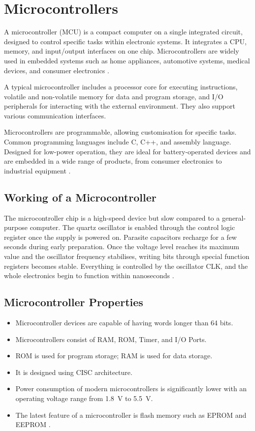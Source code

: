 \documentclass[11pt, a4paper]{report}
\begin{document}
\section{Microcontrollers}

A microcontroller (MCU) is a compact computer on a single integrated circuit,
designed to control specific tasks within electronic systems. It integrates a
CPU, memory, and input/output interfaces on one chip. Microcontrollers are
widely used in embedded systems such as home appliances, automotive systems,
medical devices, and consumer electronics \cite{geeksforgeeks}.

A typical microcontroller includes a processor core for executing
instructions, volatile and non-volatile memory for data and program storage,
and I/O peripherals for interacting with the external environment. They also
support various communication interfaces.

Microcontrollers are programmable, allowing customisation for specific tasks.
Common programming languages include C, C++, and assembly language. Designed
for low-power operation, they are ideal for battery-operated devices and are
embedded in a wide range of products, from consumer electronics to industrial
equipment \cite{geeksforgeeks}.

\subsection{Working of a Microcontroller}

The microcontroller chip is a high-speed device but slow compared to a general-purpose
computer. The quartz oscillator is enabled through the control logic register
once the supply is powered on. Parasite capacitors recharge for a few seconds
during early preparation. Once the voltage level reaches its maximum value and
the oscillator frequency stabilises, writing bits through special function
registers becomes stable. Everything is controlled by the oscillator CLK, and
the whole electronics begin to function within nanoseconds \cite{geeksforgeeks}.

\subsection{Microcontroller Properties}

\begin{itemize}
    \item Microcontroller devices are capable of having words longer than 64 bits.
    \item Microcontrollers consist of RAM, ROM, Timer, and I/O Ports.
    \item ROM is used for program storage; RAM is used for data storage.
    \item It is designed using CISC architecture.
    \item Power consumption of modern microcontrollers is significantly lower
          with an operating voltage range from \SI{1.8}{V} to \SI{5.5}{V}.
    \item The latest feature of a microcontroller is flash memory such as
          EPROM and EEPROM \cite{geeksforgeeks}.
\end{itemize}
\end{document}
